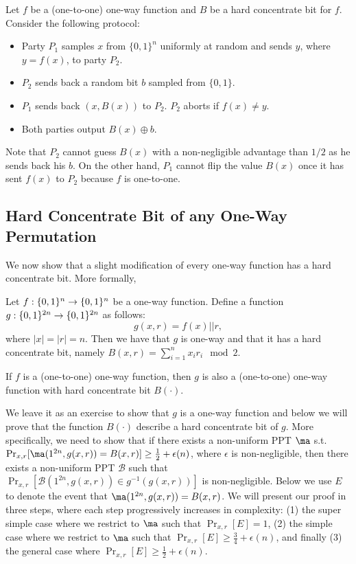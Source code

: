 Let $f$ be a (one-to-one) one-way function and $B$ be a hard concentrate bit for $f$. Consider the following protocol:
\begin{itemize}
\item[-] Party $P_1$ samples $x$ from $\{0,1\}^n$ uniformly at random and sends $y$, where $y = f(x)$, to party $P_2$.
\item[-] $P_2$ sends back a random bit $b$ sampled from $\{0,1\}$.
\item[-] $P_1$ sends back $(x, B(x))$ to $P_2$. $P_2$ aborts if $f(x) \neq y$.
\item[-]  Both parties output $B(x)\oplus b$.
\end{itemize}
Note that $P_2$ cannot guess $B(x)$ with a non-negligible advantage than $1/2$ as he sends back his $b$.
On the other hand, $P_1$ cannot flip the value $B(x)$ once it has sent $f(x)$ to $P_2$ because $f$ is one-to-one.
\fi

\subsection{Hard Concentrate Bit of any One-Way Permutation}
We now show that a slight modification of every one-way function has a hard concentrate bit. More formally,
\begin{theorem}\label{thm:hard-concentrate-bit}
Let  $f:\{0,1\}^{n} \rightarrow \{0,1\}^{n}$ be a one-way function.
Define a function $g:\{0,1\}^{2n} \rightarrow \{0,1\}^{2n}$ as follows:
$$g(x,r) = f(x) || r,$$
where $|x| = |r| =n$. Then we have that $g$ is one-way and that it has a hard concentrate bit, namely $B(x, r) = \sum_{i=1}^n x_i r_i\mod 2$.
\end{theorem}
\begin{remark}
If $f$ is a (one-to-one) one-way function, then $g$ is also a (one-to-one) one-way function with hard concentrate bit $B(\cdot)$.
\end{remark}
\proof
We leave it as an exercise to show that $g$ is a one-way function and below we will prove that the function $B(\cdot)$ describe a hard concentrate bit of $g$.
More specifically, we need to show that if there exists a non-uniform PPT  $\ma$ s.t. $\Pr_{x,r}[\ma(1^{2n},g(x,r)) = B(x,r)] \ge \frac{1}{2} + \epsilon(n)$, where $\epsilon$ is non-negligible, then there exists a non-uniform PPT $\mathcal{B}$ such that $\Pr_{x,r}[\mathcal{B}(1^{2n}, g(x,r)) \in g^{-1}(g(x,r))]$ is non-negligible.
Below we use $E$ to denote the event that $\ma(1^{2n},g(x,r)) = B(x,r)$.
We will present our proof in three steps, where each step progressively increases in complexity:
(1) the super simple case where we restrict to $\ma$ such that $\Pr_{x,r}[E] = 1$,
(2) the simple case where we restrict to $\ma$ such that $\Pr_{x,r}[E] \geq \frac34 + \epsilon(n)$,
and finally (3) the general case where $\Pr_{x,r}[E] \geq \frac12 + \epsilon(n)$.

